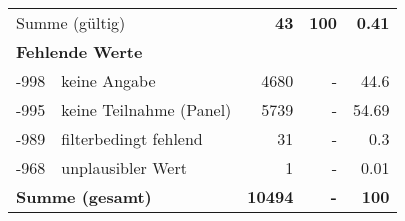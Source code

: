 \begin{longtable}{lXrrr}
     \midrule
     \multicolumn{2}{l}{Summe (gültig)} &
       \textbf{\num{43}} &
     \textbf{100} &
       \textbf{\num[round-mode=places,round-precision=2]{0,41}} \\
     \multicolumn{5}{l}{\textbf{Fehlende Werte}}\\
       -998 &
       keine Angabe &
         \num{4680} &
        - &
         \num[round-mode=places,round-precision=2]{44,6} \\
       -995 &
       keine Teilnahme (Panel) &
         \num{5739} &
        - &
         \num[round-mode=places,round-precision=2]{54,69} \\
       -989 &
       filterbedingt fehlend &
         \num{31} &
        - &
         \num[round-mode=places,round-precision=2]{0,3} \\
       -968 &
       unplausibler Wert &
         \num{1} &
        - &
         \num[round-mode=places,round-precision=2]{0,01} \\
     \midrule
     \multicolumn{2}{l}{\textbf{Summe (gesamt)}} &
          \textbf{\num{10494}} &
        \textbf{-} &
        \textbf{100} \\
     \bottomrule
     \end{longtable}
     
